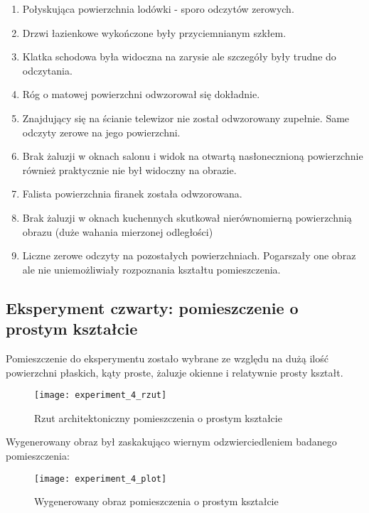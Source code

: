 \begin{enumerate}
    \item Połyskująca powierzchnia lodówki - sporo odczytów zerowych.
    \item Drzwi łazienkowe wykończone były przyciemnianym szkłem.
    \item Klatka schodowa była widoczna na zarysie ale szczegóły były trudne do odczytania.
    \item Róg o matowej powierzchni odwzorował się dokładnie.
    \item Znajdujący się na ścianie telewizor nie został odwzorowany zupełnie. Same odczyty zerowe na jego powierzchni.
    \item Brak żaluzji w oknach salonu i widok na otwartą nasłonecznioną powierzchnie również praktycznie nie był widoczny na obrazie.
    \item Falista powierzchnia firanek została odwzorowana.
    \item Brak żaluzji w oknach kuchennych skutkował nierównomierną powierzchnią obrazu (duże wahania mierzonej odległości)
    \item Liczne zerowe odczyty na pozostałych powierzchniach. Pogarszały one obraz ale nie uniemożliwiały rozpoznania kształtu pomieszczenia.
\end{enumerate}

\newpage
\subsection {Eksperyment czwarty: pomieszczenie o prostym kształcie}
Pomieszczenie do eksperymentu zostało wybrane ze względu na dużą ilość powierzchni płaskich, kąty proste, żaluzje okienne i relatywnie prosty kształt.\\
\begin{figure}[h]
    \centering
    \texttt{[image: experiment\_4\_rzut]}
    \caption{Rzut architektoniczny pomieszczenia o prostym kształcie}
    \label{fig:experiment_4_rzut}
\end{figure}

Wygenerowany obraz był zaskakująco wiernym odzwierciedleniem badanego pomieszczenia:
\begin{figure}[h]
    \centering
    \texttt{[image: experiment\_4\_plot]}
    \caption{Wygenerowany obraz pomieszczenia o prostym kształcie}
    \label{fig:experiment_4_plot}
\end{figure}

\newpage
